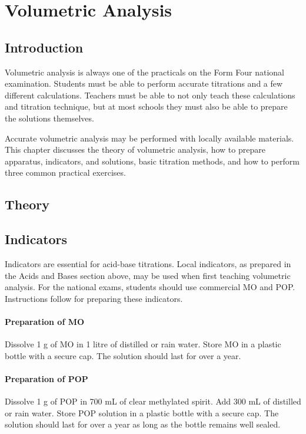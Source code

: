 
\chapter{Volumetric Analysis}
\section{Introduction}

Volumetric analysis is always one of the practicals on the Form Four national examination. Students must be able to perform accurate titrations and a few different calculations. Teachers must be able to not only teach these calculations and titration technique, but at most schools they must also be able to prepare the solutions themselves.

Accurate volumetric analysis may be performed with locally available materials. This chapter discusses the theory of volumetric analysis, how to prepare apparatus, indicators, and solutions, basic titration methods, and how to perform three common practical exercises.

\section{Theory}


\section{Indicators}

Indicators are essential for acid-base titrations. Local indicators, as prepared in the Acids and Bases section above, may be used when first teaching volumetric analysis. For the national exams, students should use commercial MO and POP. Instructions follow for preparing these indicators.

\subsubsection{Preparation of MO}
Dissolve 1 g of MO in 1 litre of distilled or rain water. Store MO in a plastic bottle with a secure cap. The solution should last for over a year.

\subsubsection{Preparation of POP}
Dissolve 1 g of POP in 700 mL of clear methylated spirit. Add 300 mL of distilled or rain water. Store POP solution in a plastic bottle with a secure cap. The solution should last for over a year as long as the bottle remains well sealed.


